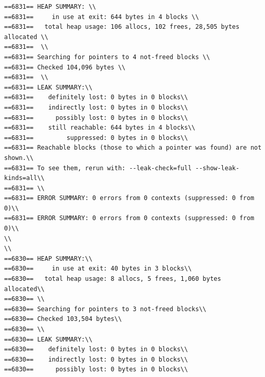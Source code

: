 \documentclass[a4paper,12pt]{report}
\begin{document}
\begin{verbatim}
==6831== HEAP SUMMARY: \\
==6831==     in use at exit: 644 bytes in 4 blocks \\
==6831==   total heap usage: 106 allocs, 102 frees, 28,505 bytes allocated \\
==6831==  \\
==6831== Searching for pointers to 4 not-freed blocks \\
==6831== Checked 104,096 bytes \\
==6831==  \\
==6831== LEAK SUMMARY:\\
==6831==    definitely lost: 0 bytes in 0 blocks\\
==6831==    indirectly lost: 0 bytes in 0 blocks\\
==6831==      possibly lost: 0 bytes in 0 blocks\\
==6831==    still reachable: 644 bytes in 4 blocks\\
==6831==         suppressed: 0 bytes in 0 blocks\\
==6831== Reachable blocks (those to which a pointer was found) are not shown.\\
==6831== To see them, rerun with: --leak-check=full --show-leak-kinds=all\\
==6831== \\
==6831== ERROR SUMMARY: 0 errors from 0 contexts (suppressed: 0 from 0)\\
==6831== ERROR SUMMARY: 0 errors from 0 contexts (suppressed: 0 from 0)\\
\\
\\
==6830== HEAP SUMMARY:\\
==6830==     in use at exit: 40 bytes in 3 blocks\\
==6830==   total heap usage: 8 allocs, 5 frees, 1,060 bytes allocated\\
==6830== \\
==6830== Searching for pointers to 3 not-freed blocks\\
==6830== Checked 103,504 bytes\\
==6830== \\
==6830== LEAK SUMMARY:\\
==6830==    definitely lost: 0 bytes in 0 blocks\\
==6830==    indirectly lost: 0 bytes in 0 blocks\\
==6830==      possibly lost: 0 bytes in 0 blocks\\

\end{verbatim}
\end{document}
